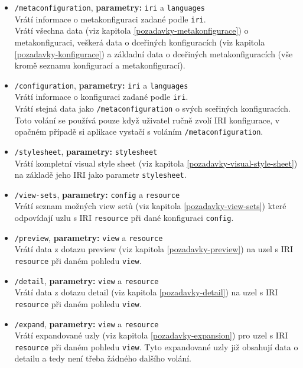 \begin{itemize}
    \item \texttt{/metaconfiguration}, \textbf{parametry:} \texttt{iri} a \texttt{languages} \\
    Vrátí informace o metakonfiguraci zadané podle \texttt{iri}. \\
    Vrátí všechna data (viz kapitola \ref{pozadavky-metakonfigurace}) o metakonfiguraci, veškerá data o dceřiných konfiguracích (viz kapitola \ref{pozadavky-konfigurace}) a základní data o dceřiných metakonfiguracích (vše kromě seznamu konfigurací a metakonfigurací).

    \item \texttt{/configuration}, \textbf{parametry:} \texttt{iri} a \texttt{languages} \\
    Vrátí informace o konfiguraci zadané podle \texttt{iri}. \\
    Vrátí stejná data jako \texttt{/metaconfiguration} o svých sceřiných konfiguracích. \\
    Toto volání se používá pouze když uživatel ručně zvolí IRI konfigurace, v opačném případě si aplikace vystačí s voláním \texttt{/metaconfiguration}.

    \item \texttt{/stylesheet}, \textbf{parametry:} \texttt{stylesheet} \\
    Vrátí kompletní visual style sheet (viz kapitola \ref{pozadavky-visual-style-sheet}) na základě jeho IRI jako parametr \texttt{stylesheet}.

    \item \texttt{/view-sets}, \textbf{parametry:} \texttt{config} a \texttt{resource} \\
    Vrátí seznam možných view setů (viz kapitola \ref{pozadavky-view-sets}) které odpovídají uzlu s IRI \texttt{resource} při dané konfiguraci \texttt{config}.

    \item \texttt{/preview}, \textbf{parametry:} \texttt{view} a \texttt{resource} \\
    Vrátí data z dotazu preview (viz kapitola \ref{pozadavky-preview}) na uzel s IRI \texttt{resource} při daném pohledu \texttt{view}.

    \item \texttt{/detail}, \textbf{parametry:} \texttt{view} a \texttt{resource} \\
    Vrátí data z dotazu detail (viz kapitola \ref{pozadavky-detail}) na uzel s IRI \texttt{resource} při daném pohledu \texttt{view}.

    \item \texttt{/expand}, \textbf{parametry:} \texttt{view} a \texttt{resource} \\
    Vrátí expandované uzly (viz kapitola \ref{pozadavky-expansion}) pro uzel s IRI \texttt{resource} při daném pohledu \texttt{view}. Tyto expandované uzly již obsahují data o detailu a tedy není třeba žádného dalšího volání.
\end{itemize}